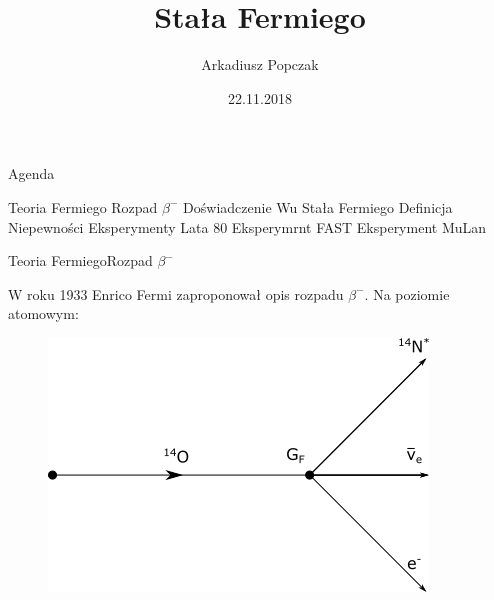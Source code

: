 \documentclass[xcolor={dvipsnames}]{beamer}
\author{Arkadiusz Popczak}
\title{Stała Fermiego}
\date{22.11.2018}
\begin{document}
\begin{frame}
    \maketitle
\end{frame}

\begin{frame}{Agenda}

    \begin{outline}[enumerate]

        \1 Teoria Fermiego
            \2 Rozpad $\beta^-$
            \2 Doświadczenie Wu
        \1 Stała Fermiego
            \2 Definicja
            \2 Niepewności
        \1 Eksperymenty
            \2 Lata 80
            \2 Eksperymrnt FAST
            \2 Eksperyment MuLan


    \end{outline}

\end{frame}

\begin{frame}{Teoria Fermiego}{Rozpad $\beta^-$}

    W roku 1933 Enrico Fermi \cite{fermi} zaproponował opis rozpadu $\beta^-$. Na poziomie atomowym:

    \begin{figure}

        \includegraphics[scale=0.8]{4points.png}

    \end{figure}

\end{frame}
\end{document}
